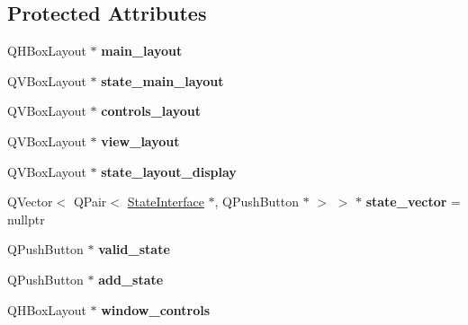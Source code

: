 \subsection*{Protected Attributes}
\begin{DoxyCompactItemize}
\item 
\mbox{\label{class_simulator_interface_a29369c1f1ca8de55510242d2925bb883}} 
Q\+H\+Box\+Layout $\ast$ {\bfseries main\+\_\+layout}
\item 
\mbox{\label{class_simulator_interface_a0ff4996226a276df2f26011c20c17cb4}} 
Q\+V\+Box\+Layout $\ast$ {\bfseries state\+\_\+main\+\_\+layout}
\item 
\mbox{\label{class_simulator_interface_a21cf19173301b898a8658e13308d4430}} 
Q\+V\+Box\+Layout $\ast$ {\bfseries controls\+\_\+layout}
\item 
\mbox{\label{class_simulator_interface_a5475df5b6b1f8cd9bb354f216fb82476}} 
Q\+V\+Box\+Layout $\ast$ {\bfseries view\+\_\+layout}
\item 
\mbox{\label{class_simulator_interface_af84d454381fccf9e25d42a05171777b2}} 
Q\+V\+Box\+Layout $\ast$ {\bfseries state\+\_\+layout\+\_\+display}
\item 
\mbox{\label{class_simulator_interface_aa39a30319b3d65e3e75a69badc2a0966}} 
Q\+Vector$<$ Q\+Pair$<$ \mbox{\hyperlink{class_state_interface}{State\+Interface}} $\ast$, Q\+Push\+Button $\ast$ $>$ $>$ $\ast$ {\bfseries state\+\_\+vector} = nullptr
\item 
\mbox{\label{class_simulator_interface_a02548393dba9375ae5a14ac5ef3565e7}} 
Q\+Push\+Button $\ast$ {\bfseries valid\+\_\+state}
\item 
\mbox{\label{class_simulator_interface_a3cca42413d2164bc16312968be504d95}} 
Q\+Push\+Button $\ast$ {\bfseries add\+\_\+state}
\item 
\mbox{\label{class_simulator_interface_a34f533a2f212d8e3a74d7af4a3393457}} 
Q\+H\+Box\+Layout $\ast$ {\bfseries window\+\_\+controls}

\end{DoxyCompactItemize}
